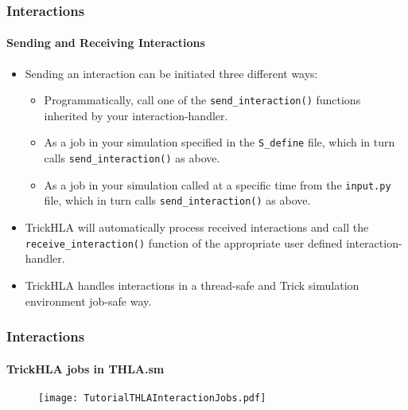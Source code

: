    \begin{frame}
      \frametitle{Interactions}
      \framesubtitle{Sending and Receiving Interactions}
      \begin{itemize}
         \item Sending an interaction can be initiated three different ways:
         \begin{itemize}
            \item Programmatically, call one of the \texttt{send\_interaction()}
            functions inherited by your interaction-handler.
            \item As a job in your simulation specified in the \texttt{S\_define}
            file, which in turn calls \texttt{send\_interaction()} as above.
            \item As a job in your simulation called at a specific time from the
            \texttt{input.py} file, which in turn calls \texttt{send\_interaction()}
            as above.
         \end{itemize}
         \item TrickHLA will automatically process received interactions and
         call the \texttt{receive\_interaction()} function of the appropriate
         user defined interaction-handler.
         \item TrickHLA handles interactions in a thread-safe and Trick
         simulation environment job-safe way.
      \end{itemize}
   \end{frame}

   \begin{frame}
      \frametitle{Interactions}
      \framesubtitle{TrickHLA jobs in THLA.sm}
      \begin{figure}
      \texttt{[image: TutorialTHLAInteractionJobs.pdf]}
      \end{figure}
   \end{frame}
   
